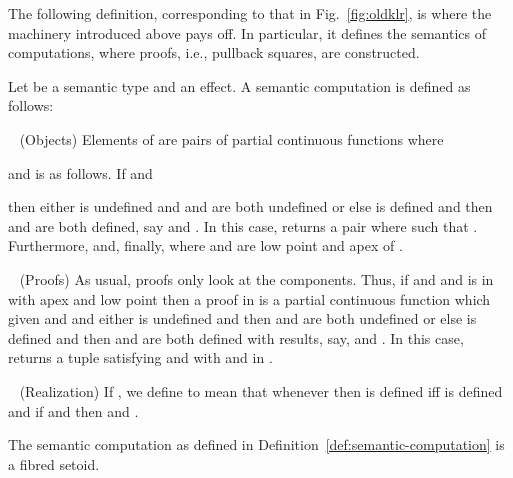 \documentclass[orivec]{llncs}
\newif\iffull\fullfalse
\begin{document}
The following definition, corresponding to that in Fig.~\ref{fig:oldklr}, is where the machinery introduced above pays off.
In particular, it defines the semantics of computations, where proofs,
i.e., pullback squares, are constructed. 

\begin{definition}\label{teffde}\label{def:semantic-computation}
  Let  be a semantic type and  an effect. A semantic
  computation  is defined as follows: 

\smallskip
\noindent \textbullet~ (Objects) Elements of  are pairs
 of partial continuous functions where
\iffull

and  is as follows.  If  and
\else



\noindent
and  is as follows.  If  and
\fi
 then  either is
undefined and  and  are both
undefined or else  is defined and then
 and  are both defined, say
 and
. In this case,
 returns a pair 
where  such that .  Furthermore,  and,
finally,  where
 and  are low point and apex of 
.  

\smallskip
\noindent \textbullet~ (Proofs) As usual, proofs only look at the 
components.
  Thus, if  and  and  is in  with apex
  and low point  then a proof in  is a partial continuous function
   which given  and  and  either is undefined and then
   and  are both undefined or else
  is defined and then  and  are
  both defined with results, say,
   and
  . In this case,
   returns a tuple  satisfying
   and 
  with  and 
  in . 


\smallskip
\noindent \textbullet~ (Realization)
  If , we define  to mean that
  whenever   then  is defined iff
 is defined and if  and
 then
 and . 
\end{definition}
\iffull
\begin{proposition}
The semantic computation  as defined in
Definition~\ref{def:semantic-computation} is a fibred setoid.
\end{proposition}
\end{document}
